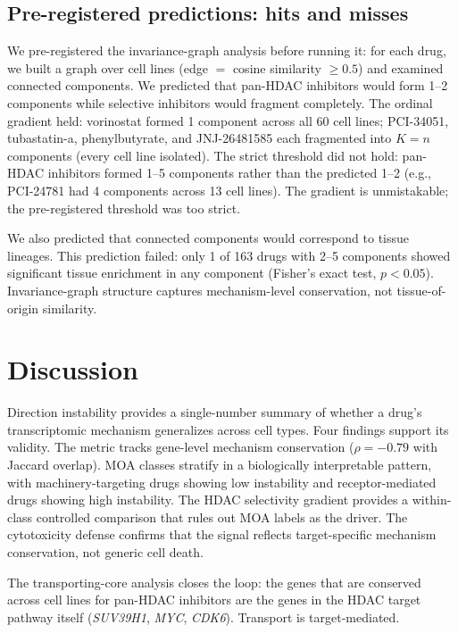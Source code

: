 \documentclass[11pt]{article}
\begin{document}
\subsection{Pre-registered predictions: hits and misses}

We pre-registered the invariance-graph analysis before running it: for
each drug, we built a graph over cell lines (edge $=$ cosine similarity
$\geq 0.5$) and examined connected components. We predicted that
pan-HDAC inhibitors would form 1--2 components while selective
inhibitors would fragment completely. The ordinal gradient held:
vorinostat formed 1 component across all 60 cell lines; PCI-34051,
tubastatin-a, phenylbutyrate, and JNJ-26481585 each fragmented into
$K = n$ components (every cell line isolated). The strict threshold
did not hold: pan-HDAC inhibitors formed 1--5 components rather
than the predicted 1--2 (e.g., PCI-24781 had 4 components across
13 cell lines). The gradient is unmistakable; the pre-registered
threshold was too strict.

We also predicted that connected components would correspond to
tissue lineages. This prediction failed: only 1 of 163 drugs with
2--5 components showed significant tissue enrichment in any component
(Fisher's exact test, $p < 0.05$). Invariance-graph structure
captures mechanism-level conservation, not tissue-of-origin similarity.

\section{Discussion}

Direction instability provides a single-number summary of whether a drug's
transcriptomic mechanism generalizes across cell types. Four findings
support its validity. The metric tracks gene-level mechanism conservation
($\rho = -0.79$ with Jaccard overlap). MOA classes stratify in a
biologically interpretable pattern, with machinery-targeting drugs
showing low instability and receptor-mediated drugs showing high
instability. The HDAC selectivity gradient provides a within-class
controlled comparison that rules out MOA labels as the driver. The
cytotoxicity defense confirms that the signal reflects target-specific
mechanism conservation, not generic cell death.

The transporting-core analysis closes the loop: the genes that are
conserved across cell lines for pan-HDAC inhibitors are the genes in
the HDAC target pathway itself (\emph{SUV39H1}, \emph{MYC},
\emph{CDK6}). Transport is target-mediated.
\end{document}
